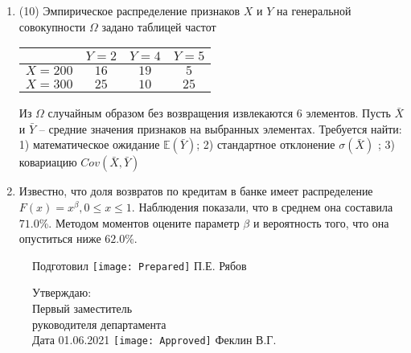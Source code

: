\documentclass[a4paper,11pt]{article}
\begin{document}
\begin{enumerate}
\item


(10) Эмпирическое распределение признаков $X$ и $Y$ на генеральной совокупности $\Omega$ задано таблицей частот  
 
\begin{tabular}{ | c | c | c | c | }
\hline
 & $Y = 2$ & $Y = 4$ & $Y = 5$  \\ \hline
$X = 200$ & $16$ & $19$ & $5$\\ \hline
$X = 300$ & $25$ & $10$ & $25$\\
\hline
\end{tabular}

Из $\Omega$ случайным образом без возвращения извлекаются $6$ элементов. 
Пусть $\bar X$ и $\bar Y$ – средние значения признаков на выбранных элементах. 
Требуется найти: 1) математическое ожидание $\mathbb{E}(\bar Y)$; 2) стандартное отклонение $\sigma(\bar X)$ ; 
3) ковариацию $Cov(\bar X, \bar Y)$


\item

    
	Известно, что доля возвратов по кредитам в банке имеет распределение $F(x) = x^{\beta}, 0 \le x \le 1$. Наблюдения показали, что в среднем она составила $71.0$\%. Методом моментов оцените параметр $\beta$ и вероятность того, что она опуститься ниже $62.0$\%.
	

\end{enumerate}

\begin{figure}[H]
	Подготовил
	\hfill
	\texttt{[image: Prepared]}
	П.Е. Рябов
\end{figure}


\begin{figure}[H]
	Утверждаю:\\
	Первый заместитель\\
	руководителя департамента\\
	Дата 01.06.2021
	\hfill
	\texttt{[image: Approved]}
	Феклин В.Г.
\end{figure}
\end{document}
